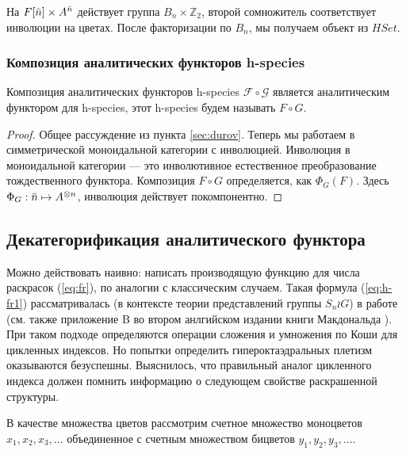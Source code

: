 На $F[\Bar n] \times A^{\Bar n}$ действует группа $B_n \times
\mathbb Z_2$, второй сомножитель соответствует инволюции на цветах. После
факторизации по $B_n$, мы получаем объект из $HSet$.

\subsubsection{Композиция аналитических функторов h-species}
\begin{theorem}
Композиция аналитических функторов h-species $\mathcal F \circ \mathcal G$
является аналитическим функтором для h-species, этот h-species будем называть $F
\circ G$.
\end{theorem}
\begin{proof}
Общее рассуждение из пункта \ref{sec:durov}. Теперь мы работаем в симметрической
моноидальной категории с инволюцией. Инволюция в моноидальной категории --- это
инволютивное естественное преобразование тождественного функтора. Композиция
$F \circ G$ определяется, как $\Phi_G(F)$. Здесь $\Phi_G : \Bar n \mapsto
A^{\otimes n}$, инволюция действует покомпонентно.
\end{proof}

\subsection{Декатегорификация аналитического функтора} 
Можно действовать наивно: написать производящую функцию для числа раскрасок
(\ref{eq:fr}), по аналогии с классическим случаем. Такая формула
(\ref{eq:h-fr1}) рассматривалась (в контексте теории представлений группы $S_n \wr G$) в работе
\cite{lambda} (см. также приложение B во втором анлгийском издании книги
Макдональда \cite{Mac2}). При таком подходе определяются операции сложения и умножения
по Коши для цикленных индексов. Но попытки определить
гипероктаэдральных плетизм оказываются безуспешны. Выяснилось, что правильный аналог цикленного
индекса должен помнить информацию о следующем свойстве раскрашенной структуры.

В качестве множества цветов рассмотрим счетное множество моноцветов $x_1,
x_2, x_3, \dots$ объединенное с счетным множеством бицветов $y_1, y_2, y_3, \dots$.


